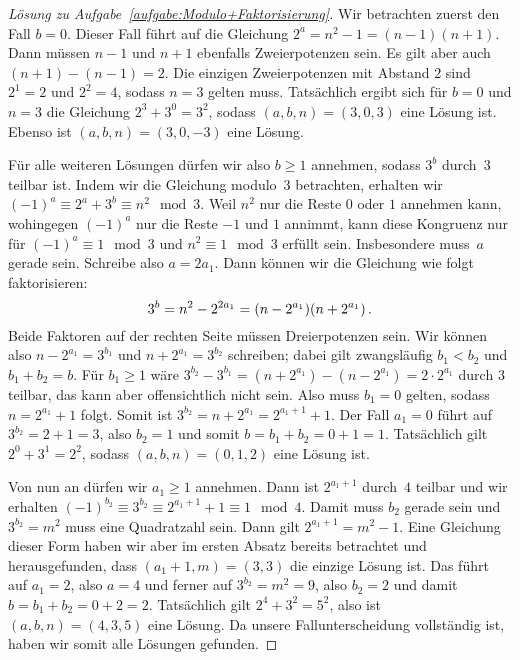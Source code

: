 \begin{proof}[Lösung zu Aufgabe~\ref{aufgabe:Modulo+Faktorisierung}]
	Wir betrachten zuerst den Fall $b=0$. Dieser Fall führt auf die Gleichung $2^a=n^2-1=(n-1)(n+1)$. Dann müssen $n-1$ und $n+1$ ebenfalls Zweierpotenzen sein. Es gilt aber auch $(n+1)-(n-1)=2$. Die einzigen Zweierpotenzen mit Abstand 2 sind $2^1=2$ und $2^2=4$, sodass $n=3$ gelten muss. Tatsächlich ergibt sich für $b=0$ und $n=3$ die Gleichung $2^3+3^0=3^2$, sodass $(a,b,n)=(3,0,3)$ eine Lösung ist. Ebenso ist $(a,b,n)=(3,0,-3)$ eine Lösung.
	
	Für alle weiteren Lösungen dürfen wir also $b\geqslant 1$ annehmen, sodass $3^b$ durch~$3$ teilbar ist. Indem wir die Gleichung modulo~$3$ betrachten, erhalten wir $(-1)^a\equiv 2^a+3^b\equiv n^2\mod 3$. Weil $n^2$ nur die Reste $0$ oder $1$ annehmen kann, wohingegen $(-1)^a$ nur die Reste $-1$ und $1$ annimmt, kann diese Kongruenz nur für $(-1)^a\equiv 1\mod 3$ und $n^2\equiv 1\mod 3$ erfüllt sein. Insbesondere muss~$a$ gerade sein. Schreibe also $a=2a_1$. Dann können wir die Gleichung wie folgt faktorisieren:
	\begin{equation*}
		3^b=n^2-2^{2a_1}=\parens*{n-2^{a_1}}\parens*{n+2^{a_1}}\,.
	\end{equation*}
	Beide Faktoren auf der rechten Seite müssen Dreierpotenzen sein. Wir können also $n-2^{a_1}=3^{b_1}$ und $n+2^{a_1}=3^{b_2}$ schreiben; dabei gilt zwangsläufig $b_1<b_2$ und $b_1+b_2=b$. Für $b_1\geqslant 1$ wäre $3^{b_2}-3^{b_1}=(n+2^{a_1})-(n-2^{a_1})=2\cdot 2^{a_1}$ durch $3$ teilbar, das kann aber offensichtlich nicht sein. Also muss $b_1=0$ gelten, sodass $n=2^{a_1}+1$ folgt. Somit ist $3^{b_2}=n+2^{a_1}=2^{a_1+1}+1$. Der Fall $a_1=0$ führt auf $3^{b_2}=2+1=3$, also $b_2=1$ und somit $b=b_1+b_2=0+1=1$. Tatsächlich gilt $2^0+3^1=2^2$, sodass $(a,b,n)=(0,1,2)$ eine Lösung ist.
	
	Von nun an dürfen wir $a_1\geqslant 1$ annehmen. Dann ist $2^{a_1+1}$ durch~$4$ teilbar und wir erhalten $(-1)^{b_2}\equiv 3^{b_2}\equiv 2^{a_1+1}+1\equiv 1\mod 4$. Damit muss $b_2$ gerade sein und $3^{b_2}=m^2$ muss eine Quadratzahl sein. Dann gilt $2^{a_1+1}=m^2-1$. Eine Gleichung dieser Form haben wir aber im ersten Absatz bereits betrachtet und herausgefunden, dass $(a_1+1,m)=(3,3)$ die einzige Lösung ist. Das führt auf $a_1=2$, also $a=4$ und ferner auf $3^{b_2}=m^2=9$, also $b_2=2$ und damit $b=b_1+b_2=0+2=2$. Tatsächlich gilt $2^4+3^2=5^2$, also ist $(a,b,n)=(4,3,5)$ eine Lösung. Da unsere Fallunterscheidung vollständig ist, haben wir somit alle Lösungen gefunden.
\end{proof}

